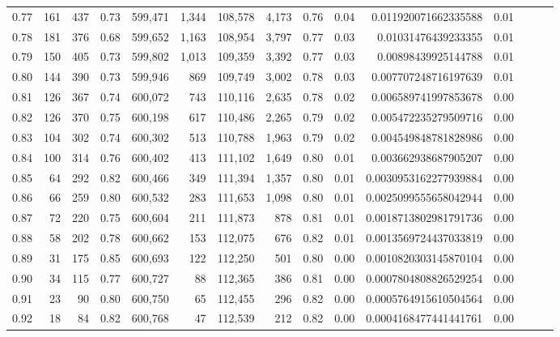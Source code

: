 \begin{tabular}{rrrrrrrrrrrrrrr}
0.77 &     161 &    437 &  0.73 &  599,471 &    1,344 &  108,578 &    4,173 &  0.76 &  0.04 &    0.011920071662335588 &      0.01 \\
0.78 &     181 &    376 &  0.68 &  599,652 &    1,163 &  108,954 &    3,797 &  0.77 &  0.03 &     0.01031476439233355 &      0.01 \\
0.79 &     150 &    405 &  0.73 &  599,802 &    1,013 &  109,359 &    3,392 &  0.77 &  0.03 &     0.00898439925144788 &      0.01 \\
0.80 &     144 &    390 &  0.73 &  599,946 &      869 &  109,749 &    3,002 &  0.78 &  0.03 &    0.007707248716197639 &      0.01 \\
0.81 &     126 &    367 &  0.74 &  600,072 &      743 &  110,116 &    2,635 &  0.78 &  0.02 &    0.006589741997853678 &      0.00 \\
0.82 &     126 &    370 &  0.75 &  600,198 &      617 &  110,486 &    2,265 &  0.79 &  0.02 &    0.005472235279509716 &      0.00 \\
0.83 &     104 &    302 &  0.74 &  600,302 &      513 &  110,788 &    1,963 &  0.79 &  0.02 &    0.004549848781828986 &      0.00 \\
0.84 &     100 &    314 &  0.76 &  600,402 &      413 &  111,102 &    1,649 &  0.80 &  0.01 &    0.003662938687905207 &      0.00 \\
0.85 &      64 &    292 &  0.82 &  600,466 &      349 &  111,394 &    1,357 &  0.80 &  0.01 &   0.0030953162277939884 &      0.00 \\
0.86 &      66 &    259 &  0.80 &  600,532 &      283 &  111,653 &    1,098 &  0.80 &  0.01 &   0.0025099555658042944 &      0.00 \\
0.87 &      72 &    220 &  0.75 &  600,604 &      211 &  111,873 &      878 &  0.81 &  0.01 &   0.0018713802981791736 &      0.00 \\
0.88 &      58 &    202 &  0.78 &  600,662 &      153 &  112,075 &      676 &  0.82 &  0.01 &   0.0013569724437033819 &      0.00 \\
0.89 &      31 &    175 &  0.85 &  600,693 &      122 &  112,250 &      501 &  0.80 &  0.00 &   0.0010820303145870104 &      0.00 \\
0.90 &      34 &    115 &  0.77 &  600,727 &       88 &  112,365 &      386 &  0.81 &  0.00 &   0.0007804808826529254 &      0.00 \\
0.91 &      23 &     90 &  0.80 &  600,750 &       65 &  112,455 &      296 &  0.82 &  0.00 &   0.0005764915610504564 &      0.00 \\
0.92 &      18 &     84 &  0.82 &  600,768 &       47 &  112,539 &      212 &  0.82 &  0.00 &   0.0004168477441441761 &      0.00 \\

\end{tabular}
